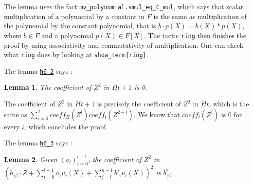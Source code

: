 \documentclass{article}
\newtheorem{lemma}{Lemma}
\theoremstyle{definition}
\theoremstyle{remark}
\begin{document}
The lemma uses the fact \texttt{mv\_polynomial.smul\_eq\_C\_mul}, which says that scalar multiplication of a polynomial by a constant in $F$ is the same as multiplication of 
the polynomial by the constant polynomial, that is $b \cdot p(X) = b(X) * p(X)$, where $b \in F$ and a polynomial $p(X) \in F[X]$. The tactic \texttt{ring} then finishes the proof 
by using associativity and commutativity of multiplication. One can check what \texttt{ring} does by looking at \texttt{show\_term\{ring\}}.

The lemma \href{https://github.com/BoltonBailey/formal-snarks-project/blob/7fd9cd122f5887f88f6a706b4f2a68a7153c7381/src/snarks/babysnark/knowledge_soundness.lean#L279}{\texttt{h6\_2}} says : 
\theoremstyle{lemma}
\begin{lemma} \label{h6_2}
  The coefficient of $Z^2$ in $H t + 1$ is 0.
\end{lemma}

The coefficient of $Z^2$ in $H t + 1$ is precisely the coefficient of $Z^2$ in $H t$, which is the same as $\sum_{i= 0}^2 coeff_{H}(Z^i) coeff_{t}(Z^{2 - i})$.
We know that $coeff_{t}(Z^i)$ is 0 for every $i$, which concludes the proof.

The lemma \href{https://github.com/BoltonBailey/formal-snarks-project/blob/7fd9cd122f5887f88f6a706b4f2a68a7153c7381/src/snarks/babysnark/knowledge_soundness.lean#L311}{\texttt{h6\_3}} says : 
\theoremstyle{lemma}
\begin{lemma} \label{h6_3}
  Given $(a_i)_{i = 0}^{l - 1}$, the coefficient of $Z^2$ in $(b_{\gamma \beta} \cdot Z + \sum_{i = 0}^{l - 1} a_i u_i (X) + \sum_{j = l}^{n - 1} b'_i u_i (X))^2$ is $b_{\gamma \beta}^2$.
\end{lemma}
\end{document}
